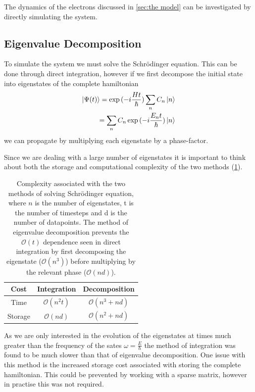 The dynamics of the electrons
discussed in \cref{sec:the model}
can be investigated by
directly simulating the system.

\subsection{Eigenvalue Decomposition}
To simulate the system we must solve
the Schrödinger equation. This
can be done through direct
integration, however
if we first decompose
the initial state
into eigenstates
of the complete hamiltonian
\begin{align}
    \ket{\Psi(t)} = \exp{(-i\frac{Ht}{\hbar})} \sum_n C_n \ket{n} \\
    = \sum_n C_n \exp{(-i\frac{E_n t}{\hbar})} \ket{n}
\end{align}
we can propagate
by multiplying each eigenstate
by a phase-factor.

Since we are dealing with a
large number of eigenstates
it is important to think
about both the storage
and computational complexity
of the two methods (\cref{tab:algorithm complexity}).
\begin{table}[htbp]
    \begin{center}
        \begin{tabular}{ *{3}{c} }
            \toprule
            Cost    & Integration            & Decomposition              \\
            \midrule
            Time    & \(\mathcal{O}(n^2 t)\) & \(\mathcal{O}(n^3 + n d)\) \\
            Storage & \(\mathcal{O}(n d)\)   & \(\mathcal{O}(n^2 + n d)\) \\
            \bottomrule
        \end{tabular}
    \end{center}
    \caption{Complexity associated with the
        two methods of solving Schrödinger equation,
        where \(n\) is the number of eigenstates, t
        is the number of timesteps and d is the
        number of datapoints. The method
        of eigenvalue decomposition
        prevents the \(\mathcal{O}(t)\)
        dependence seen
        in direct integration
        by first decomposing the
        eigenstate (\(\mathcal{O}(n^3)\))
        before multiplying
        by the relevant phase
        (\(\mathcal{O}(nd)\)).
    }\label{tab:algorithm complexity}
\end{table}

As we
are only interested in the
evolution of the eigenstates
at times much greater than
the frequency of the sates
\(\omega = \frac{E}{\hbar}\)
the method of integration
was found to be much
slower than that of eigenvalue
decomposition. One
issue with this method
is the increased storage
cost associated with
storing the complete
hamiltonian. This could
be prevented by
working with a sparse
matrix, however in
practise this
was not required.

